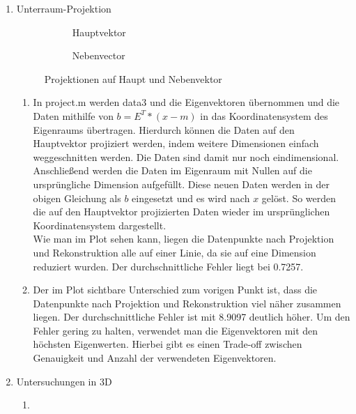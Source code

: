 \documentclass[]{report}
\newlength\figureheight
\newlength\figurewidth
\begin{document}
\begin{enumerate}
\begin{enumerate}
		\end{enumerate}
		\item Unterraum-Projektion
		
		\setlength\figureheight{5cm}
		\setlength{}
		\begin{figure}[tbp!]
			\begin{subfigure}{0.45\textwidth}
				\centering
				
				\caption{Hauptvektor}
				\label{fig:projection1}
			\end{subfigure}
			\qquad
			\begin{subfigure}{0.45\textwidth}
				\centering
				
				\caption{Nebenvector}
				\label{fig:projection2}
			\end{subfigure}	
			\caption{Projektionen auf Haupt und Nebenvektor}
			\label{fig:projection}
		\end{figure}
		
		\begin{enumerate}
			\item
			In project.m werden data3 und die Eigenvektoren übernommen und die Daten mithilfe von $b=E^{T}*(x-m)$ in das Koordinatensystem des Eigenraums übertragen. Hierdurch können die Daten auf den Hauptvektor projiziert werden, indem weitere Dimensionen einfach weggeschnitten werden. Die Daten sind damit nur noch eindimensional.\\
			Anschließend werden die Daten im Eigenraum mit Nullen auf die ursprüngliche Dimension aufgefüllt. Diese neuen Daten werden in der obigen Gleichung als $b$ eingesetzt und es wird nach $x$ gelöst. So werden die auf den Hauptvektor projizierten Daten wieder im ursprünglichen Koordinatensystem dargestellt.\\
			Wie man im Plot sehen kann, liegen die Datenpunkte nach Projektion und Rekonstruktion alle auf einer Linie, da sie auf eine Dimension reduziert wurden. Der durchschnittliche Fehler liegt bei 0.7257.
			\item
			Der im Plot sichtbare Unterschied zum vorigen Punkt ist, dass die Datenpunkte nach Projektion und Rekonstruktion viel näher zusammen liegen. Der durchschnittliche Fehler ist mit 8.9097 deutlich höher. Um den Fehler gering zu halten, verwendet man die Eigenvektoren mit den höchsten Eigenwerten. Hierbei gibt es einen Trade-off zwischen Genauigkeit und Anzahl der verwendeten Eigenvektoren.
		\end{enumerate}
		
		\item Untersuchungen in 3D
		\begin{enumerate}
			\item
			

\end{enumerate}
\end{enumerate}
\end{document}
